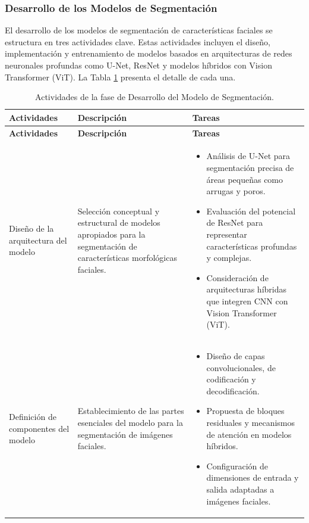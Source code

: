  \subsubsection{Desarrollo de los Modelos de Segmentación}
 El desarrollo de los modelos de segmentación de características faciales se estructura en tres actividades clave. Estas actividades incluyen el diseño, implementación y entrenamiento de modelos basados en arquitecturas de redes neuronales profundas como U-Net, ResNet y modelos híbridos con Vision Transformer (ViT). La Tabla \ref{tabla:actividades_segmentacion} presenta el detalle de cada una.

 \vspace{2ex}
 \begingroup
 \renewcommand\arraystretch{1.2}
 \begin{longtable}{p{4cm} p{6cm} p{6cm}}
 \caption{Actividades de la fase de Desarrollo del Modelo de Segmentación.}
 \label{tabla:actividades_segmentacion}\\
 \toprule
 \textbf{Actividades} & \textbf{Descripción} & \textbf{Tareas} \\
 \midrule
 \endfirsthead
 
 \toprule
 \textbf{Actividades} & \textbf{Descripción} & \textbf{Tareas} \\
 \midrule
 \endhead
 
 \bottomrule
 \endfoot
 
 Diseño de la arquitectura del modelo & Selección conceptual y estructural de modelos apropiados para la segmentación de características morfológicas faciales. &
 \begin{itemize}
     \item Análisis de U-Net para segmentación precisa de áreas pequeñas como arrugas y poros.
     \item Evaluación del potencial de ResNet para representar características profundas y complejas.
     \item Consideración de arquitecturas híbridas que integren CNN con Vision Transformer (ViT).
 \end{itemize} \\
 
 Definición de componentes del modelo & Establecimiento de las partes esenciales del modelo para la segmentación de imágenes faciales. &
 \begin{itemize}
     \item Diseño de capas convolucionales, de codificación y decodificación.
     \item Propuesta de bloques residuales y mecanismos de atención en modelos híbridos.
     \item Configuración de dimensiones de entrada y salida adaptadas a imágenes faciales.
 \end{itemize} \\
 

\end{longtable}
